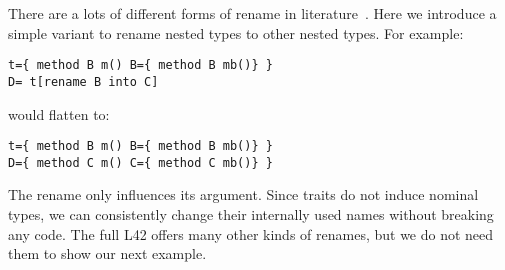 


There are a lots of different forms of rename in
literature~\cite{deep,ancona2002calculus,bracha1992programming}.
Here we introduce a simple variant to rename nested types to other nested types.
For example:
\begin{lstlisting}
t={ method B m() B={ method B mb()} }
D= t[rename B into C]
\end{lstlisting}
\saveSpace
would flatten to:
\saveSpace
\begin{lstlisting}
t={ method B m() B={ method B mb()} }
D={ method C m() C={ method C mb()} }
\end{lstlisting}\saveSpace
The rename only influences its argument.
Since traits do not induce nominal types, we can
consistently change their
internally used names without breaking any code.
The full L42 offers many other kinds of renames, but we do not need them to show our next example.

